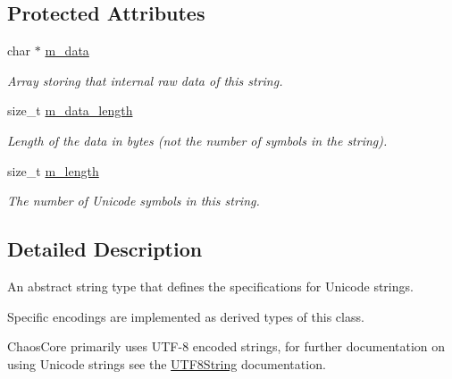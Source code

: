 \subsection*{Protected Attributes}
\begin{DoxyCompactItemize}
\item 
\hypertarget{classchaos_1_1uni_1_1_u_string_ac935621b37a9c94ebd06369ec557c533}{}char $\ast$ \hyperlink{classchaos_1_1uni_1_1_u_string_ac935621b37a9c94ebd06369ec557c533}{m\+\_\+data}\label{classchaos_1_1uni_1_1_u_string_ac935621b37a9c94ebd06369ec557c533}

\begin{DoxyCompactList}\small\item\em Array storing that internal raw data of this string. \end{DoxyCompactList}\item 
\hypertarget{classchaos_1_1uni_1_1_u_string_a10431ca2c0c8b6d6bc92ab7bfd952395}{}size\+\_\+t \hyperlink{classchaos_1_1uni_1_1_u_string_a10431ca2c0c8b6d6bc92ab7bfd952395}{m\+\_\+data\+\_\+length}\label{classchaos_1_1uni_1_1_u_string_a10431ca2c0c8b6d6bc92ab7bfd952395}

\begin{DoxyCompactList}\small\item\em Length of the data in bytes (not the number of symbols in the string). \end{DoxyCompactList}\item 
\hypertarget{classchaos_1_1uni_1_1_u_string_a2929cd818b3dcfdd449a4deab760f5de}{}size\+\_\+t \hyperlink{classchaos_1_1uni_1_1_u_string_a2929cd818b3dcfdd449a4deab760f5de}{m\+\_\+length}\label{classchaos_1_1uni_1_1_u_string_a2929cd818b3dcfdd449a4deab760f5de}

\begin{DoxyCompactList}\small\item\em The number of Unicode symbols in this string. \end{DoxyCompactList}\end{DoxyCompactItemize}


\subsection{Detailed Description}
An abstract string type that defines the specifications for Unicode strings. 

Specific encodings are implemented as derived types of this class.

Chaos\+Core primarily uses U\+T\+F-\/8 encoded strings, for further documentation on using Unicode strings see the \hyperlink{classchaos_1_1uni_1_1_u_t_f8_string}{U\+T\+F8\+String} documentation. 

